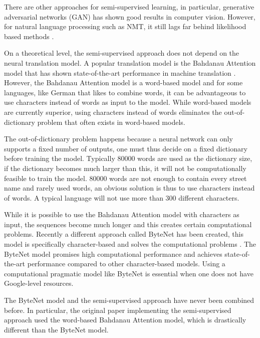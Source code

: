 There are other approaches for semi-supervised learning, in particular, generative adversarial networks (GAN) has shown good results in computer vision. However, for natural language processing such as NMT, it still lags far behind likelihood based methods \cite{gan-on-nlp}.

On a theoretical level, the semi-supervised approach does not depend on the neural translation model. A popular translation model is the Bahdanau Attention model that has shown state-of-the-art performance in machine translation \cite{bahdanau-2015-nmt}. However, the Bahdanau Attention model is a word-based model and for some languages, like German that likes to combine words, it can be advantageous to use characters instead of words as input to the model. While word-based models are currently superior, using characters instead of words eliminates the out-of-dictionary problem that often exists in word-based models.

The out-of-dictionary problem happens because a neural network can only supports a fixed number of outputs, one must thus decide on a fixed dictionary before training the model. Typically 80000 words are used as the dictionary size, if the dictionary becomes much larger than this, it will not be computationally feasible to train the model. 80000 words are not enough to contain every street name and rarely used words, an obvious solution is thus to use characters instead of words. A typical language will not use more than 300 different characters.

While it is possible to use the Bahdanau Attention model with characters as input, the sequences become much longer and this creates certain computational problems. Recently a different approach called ByteNet has been created, this model is specifically character-based and solves the computational problems \cite{bytenet}. The ByteNet model promises high computational performance and achieves state-of-the-art performance compared to other character-based models. Using a computational pragmatic model like ByteNet is essential when one does not have Google-level resources.

The ByteNet model and the semi-supervised approach have never been combined before. In particular, the original paper implementing the semi-supervised approach used the word-based Bahdanau Attention model, which is drastically different than the ByteNet model.


